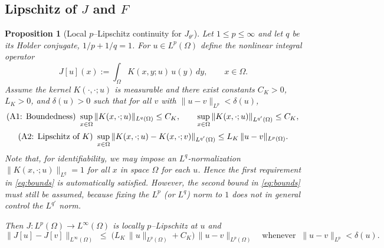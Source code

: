 \documentclass[11pt,a4paper]{article}
\theoremstyle{plain}
\newtheorem{proposition}[theorem]{Proposition}
\theoremstyle{definition}
\theoremstyle{remark}
\begin{document}



\subsection{Lipschitz of $J$ and $F$}
\begin{proposition}[Local $p$--Lipschitz continuity for $J_{\theta\prime}$]\label{prop:Lip-simple}
	Let $1 \le p \le \infty$ and let $q$ be its Holder conjugate, $1/p+1/q=1$.
	For $u\in L^p(\Omega)$ define the nonlinear integral operator
	\[
		J[u](x):=\int_\Omega K(x,y;u)\,u(y)\,dy,\qquad x\in\Omega .
	\]
	Assume the kernel $K(\cdot,\cdot;u)$ is measurable and there exist
	constants $C_K>0$, $L_K>0$, and $\delta(u)>0$ such that for all $v$ with
	$\|u-v\|_{L^p}<\delta(u)$,
	\begin{equation}\label{eq:bounds}
		\text{\normalfont(A1: Boundedness) } \sup_{x\in\Omega}\|K(x,\cdot;u)\|_{L^{q}(\Omega)}\le C_K,
		\qquad
		\sup_{x\in\Omega}\|K(x,\cdot;u)\|_{L^{q'}(\Omega)}\le C_K,            \\
	\end{equation}
	\begin{equation}\label{eq:LipK}
		\text{\normalfont(A2: Lipschitz of $K$) } \sup_{x\in\Omega}\|K(x,\cdot;u)-K(x,\cdot;v)\|_{L^{q'}(\Omega)}
		\le L_K\,\|u-v\|_{L^p(\Omega)}.
	\end{equation}
	Note that, for identifiability, we may impose an $L^{q}$-normalization
	$\|K(x,\cdot;u)\|_{L^{q}}=1$ for all $x$ in space $\Omega$ for each $u$.
	Hence the first requirement in \eqref{eq:bounds} is automatically satisfied.
	However, the second bound in \eqref{eq:bounds} must still be assumed,
	because fixing the $L^{p}$ (or $L^{q}$) norm to $1$ does not in general
	control the $L^{q'}$ norm.

	Then $J:L^p(\Omega)\to L^\infty(\Omega)$ is locally $p$--Lipschitz at $u$ and
	\[
		\|J[u]-J[v]\|_{L^\infty(\Omega)}
		\;\le\; \Big(L_K\,\|u\|_{L^p(\Omega)}+C_K\Big)\,\|u-v\|_{L^p(\Omega)}
		\quad \text{whenever }\ \|u-v\|_{L^p}<\delta(u).
	\]
\end{proposition}
\end{document}
